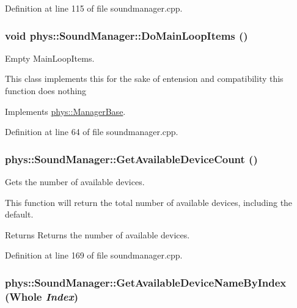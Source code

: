 Definition at line 115 of file soundmanager.cpp.

\hypertarget{classphys_1_1SoundManager_a577b228753ea19856b8476ab831e547e}{
\subsubsection[{DoMainLoopItems}]{\setlength{\rightskip}{0pt plus 5cm}void phys::SoundManager::DoMainLoopItems ()}}
\label{d1/dc4/classphys_1_1SoundManager_a577b228753ea19856b8476ab831e547e}


Empty MainLoopItems. 

This class implements this for the sake of entension and compatibility this function does nothing 

Implements \hyperlink{classphys_1_1ManagerBase_aa9e13a3f7c398b708f0f242610b5abf7}{phys::ManagerBase}.



Definition at line 64 of file soundmanager.cpp.

\hypertarget{classphys_1_1SoundManager_adb5717af71da8829600fd613a2ce615b}{
\subsubsection[{GetAvailableDeviceCount}]{ phys::SoundManager::GetAvailableDeviceCount ()}}
\label{d1/dc4/classphys_1_1SoundManager_adb5717af71da8829600fd613a2ce615b}


Gets the number of available devices. 

This function will return the total number of available devices, including the default. \begin{DoxyReturn}{Returns}
Returns the number of available devices. 
\end{DoxyReturn}


Definition at line 169 of file soundmanager.cpp.

\hypertarget{classphys_1_1SoundManager_a842f7cba6b12585bca77f642ecb8be79}{
\subsubsection[{GetAvailableDeviceNameByIndex}]{ phys::SoundManager::GetAvailableDeviceNameByIndex ({\bf Whole} {\em Index})}}
\label{d1/dc4/classphys_1_1SoundManager_a842f7cba6b12585bca77f642ecb8be79}



